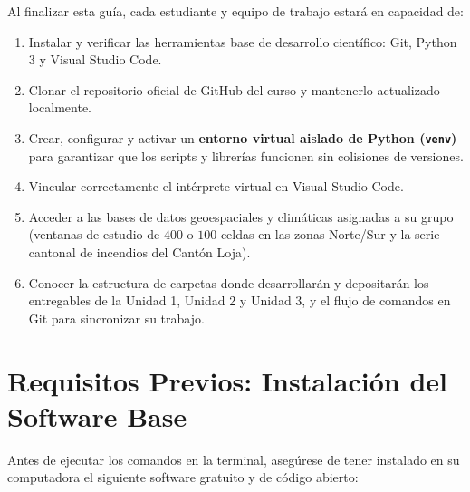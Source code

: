 \documentclass[11pt,a4paper]{article}
\begin{document}
\begin{conceptbox}[title=Objetivos de Aprendizaje Operativo]
Al finalizar esta guía, cada estudiante y equipo de trabajo estará en capacidad de:
\begin{enumerate}[leftmargin=*,itemsep=1.5pt]
  \item Instalar y verificar las herramientas base de desarrollo científico: Git, Python 3 y Visual Studio Code.
  \item Clonar el repositorio oficial de GitHub del curso y mantenerlo actualizado localmente.
  \item Crear, configurar y activar un \textbf{entorno virtual aislado de Python (\texttt{venv})} para garantizar que los scripts y librerías funcionen sin colisiones de versiones.
  \item Vincular correctamente el intérprete virtual en Visual Studio Code.
  \item Acceder a las bases de datos geoespaciales y climáticas asignadas a su grupo (ventanas de estudio de $400$ o $100$ celdas en las zonas Norte/Sur y la serie cantonal de incendios del Cantón Loja).
  \item Conocer la estructura de carpetas donde desarrollarán y depositarán los entregables de la Unidad 1, Unidad 2 y Unidad 3, y el flujo de comandos en Git para sincronizar su trabajo.
\end{enumerate}
\end{conceptbox}

\section{Requisitos Previos: Instalación del Software Base}

Antes de ejecutar los comandos en la terminal, asegúrese de tener instalado en su computadora el siguiente software gratuito y de código abierto:
\end{document}
